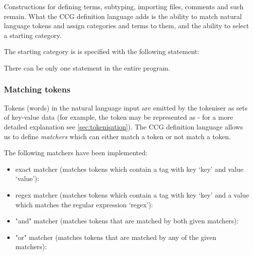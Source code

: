 \documentclass[main.tex]{subfiles}
\begin{document}

Constructions for defining terms, subtyping, importing files, comments and such
remain. What the CCG definition language adds is the ability to match natural
language tokens and assign categories and terms to them, and the ability to
select a starting category.

The starting category is is specified with the following statement:
\begin{center}
\end{center}
There can be only one  statement in the entire program.

\subsubsection{Matching tokens}
Tokens (words) in the natural language input are emitted by the
tokeniser as sets of
key-value data (for example, the token  may be represented as
 - for a more detailed explanation
see \cref{sec:tokenisation}). The CCG definition language allows us to define
\emph{matchers} which can either match a token or not match a token.

The following matchers have been implemented:

\begin{itemize}
    \item exact matcher (matches tokens which contain a tag with key `key'
        and value `value'):
        \begin{center}
        \end{center}
    \item regex matcher (matches tokens which contain a tag with key `key'
        and a value which matches the regular expression `regex'):
        \begin{center}
        \end{center}
    \item "and" matcher (matches tokens that are matched by both given matchers):
        \begin{center}
            \code{ \& }
        \end{center}
    \item "or" matcher (matches tokens that are matched by any of the given matchers):
        \begin{center}
            \code{ | }
        \end{center}
\end{itemize}
\end{document}
